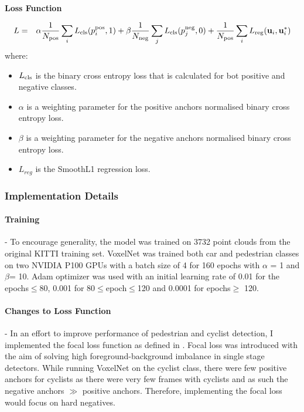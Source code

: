 \noindent
\textbf{Loss Function} 

\begin{eqnarray}
	 L & = & \alpha\frac{1}{N_{\text{\scriptsize pos}}} \sum\limits_{i} L_{\text{\scriptsize cls}}(p^{\text{\scriptsize pos}}_i, 1) + 
	\beta\frac{1}{N_{\text{\scriptsize neg}}} \sum\limits_{j} L_{\text{\scriptsize cls}}(p^{\text{\scriptsize neg}}_j, 0) \nonumber  + \frac{1}{N_{\text{\scriptsize pos}}} \sum\limits_{i} L_{\text{\scriptsize reg}}(\mathbf{u}_i, \mathbf{u}_i^*)	
	\label{eqn}
\end{eqnarray}
where:
\begin{itemize}[noitemsep]
	\item $L_{\text{\scriptsize cls}}$ is the binary cross entropy loss that is calculated for bot positive and negative classes. 
	\item $\alpha$ is a weighting parameter for the positive anchors normalised binary cross entropy loss. 
	\item $\beta$ is a weighting parameter for the negative anchors normalised binary cross entropy loss.
	\item $L_{reg}$ is the SmoothL1 regression loss.
\end{itemize}

\subsubsection{Implementation Details}
\paragraph{Training} - 
To encourage generality, the model was trained on 3732 point clouds from the original KITTI training set.
VoxelNet was trained both car and pedestrian classes on two NVIDIA P100 GPUs with a batch size of 4 for 160 epochs  with $\alpha$ = 1 and  $\beta$= 10. Adam optimizer was used with an initial learning rate of 0.01 for the epochs$\le$80, 0.001 for 80$\le$epoch$\le$120 and 0.0001 for epochs$\ge$ 120. 


\paragraph{Changes to Loss Function } - 
In an effort to improve performance of pedestrian and cyclist detection, I implemented the focal loss function as defined in \cite{lin2018focal}. Focal loss was introduced with the aim of solving high foreground-background imbalance in single stage detectors. While running VoxelNet on the cyclist class, there were few positive anchors for cyclists as there were very few frames with cyclists and as such the negative anchors $\gg$ positive anchors. Therefore, implementing the focal loss would focus on hard negatives.
 
